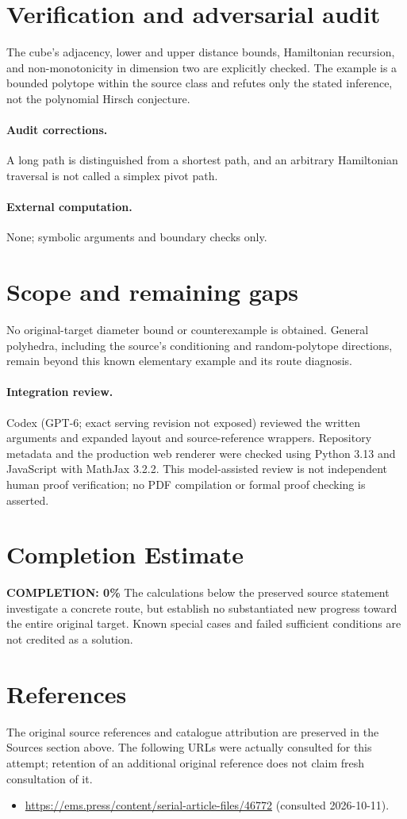 \documentclass[11pt]{article}
\begin{document}
\section{Verification and adversarial audit}
The cube's adjacency, lower and upper distance bounds, Hamiltonian recursion, and non-monotonicity in dimension two are explicitly checked. The example is a bounded polytope within the source class and refutes only the stated inference, not the polynomial Hirsch conjecture.
\paragraph{Audit corrections.} A long path is distinguished from a shortest path, and an arbitrary Hamiltonian traversal is not called a simplex pivot path.
\paragraph{External computation.} None; symbolic arguments and boundary checks only.
\section{Scope and remaining gaps}
No original-target diameter bound or counterexample is obtained. General polyhedra, including the source's conditioning and random-polytope directions, remain beyond this known elementary example and its route diagnosis.
\paragraph{Integration review.} Codex (GPT-6; exact serving revision not exposed) reviewed the written arguments and expanded layout and source-reference wrappers. Repository metadata and the production web renderer were checked using Python 3.13 and JavaScript with MathJax 3.2.2. This model-assisted review is not independent human proof verification; no PDF compilation or formal proof checking is asserted.

\section{Completion Estimate}
\noindent\textbf{COMPLETION: 0\%}
The calculations below the preserved source statement investigate a concrete route,
but establish no substantiated new progress toward the entire original target.
Known special cases and failed sufficient conditions are not credited as a solution.
\section{References}
The original source references and catalogue attribution are preserved in the
Sources section above. The following URLs were actually consulted for this attempt;
retention of an additional original reference does not claim fresh consultation of it.
\begin{itemize}
\item \url{https://ems.press/content/serial-article-files/46772} (consulted 2026-10-11). 
\end{itemize}
\end{document}
